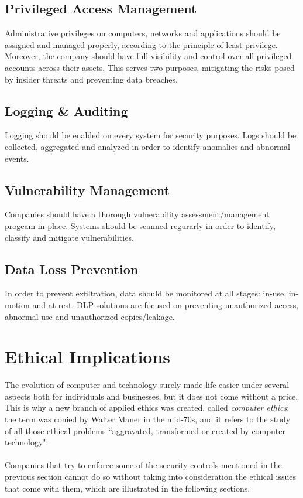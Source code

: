 \documentclass[12pt]{extarticle}
\begin{document}
	\subsection{Privileged Access Management}
	Administrative privileges on computers, networks and applications should be assigned and managed properly, according to the principle of least privilege. Moreover, the company should have full visibility and control over all privileged accounts across their assets. This serves two purposes, mitigating the risks posed by insider threats and preventing data breaches.
	\subsection{Logging \& Auditing}
	Logging should be enabled on every system for security purposes. Logs should be collected, aggregated and analyzed in order to identify anomalies and abnormal events.
	\subsection{Vulnerability Management}
	Companies should have a thorough vulnerability assessment/management progeam in place. Systems should be scanned regurarly in order to identify, classify and mitigate vulnerabilities.
	\subsection{Data Loss Prevention}
	In order to prevent exfiltration, data should be monitored at all stages: in-use, in-motion and at rest. DLP solutions are focused on preventing unauthorized access, abnormal use and unauthorized copies/leakage.
	\newpage
	\section{Ethical Implications}
	The evolution of computer and technology surely made life easier under several aspects both for individuals and businesses, but it does not come without a price. This is why a new branch of applied ethics was created, called \textit{computer ethics}: the term was conied by Walter Maner in the mid-70s, and it refers to the study of all those ethical problems ``aggravated, transformed or created by computer 
	technology"\cite{cyberethics}.\\\\
	Companies that try to enforce some of the security controls mentioned in the previous section cannot do so without taking into consideration the ethical issues that come with them, which are illustrated in the following sections.
\end{document}
